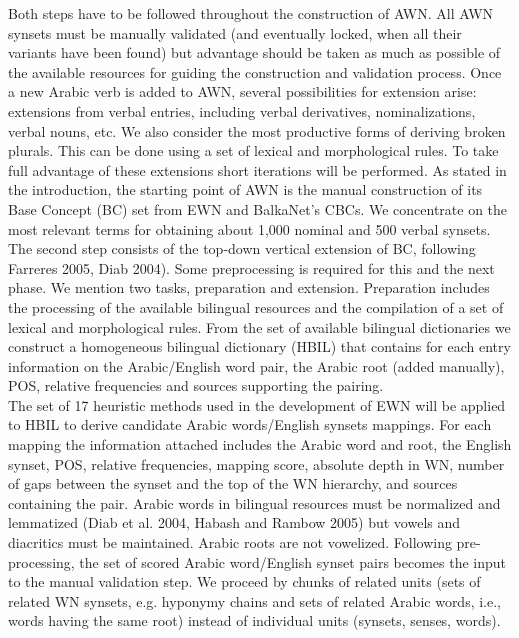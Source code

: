 Both steps have to be followed throughout the construction of AWN. All AWN synsets must be manually validated (and eventually locked, when all their variants have been found) but advantage should be taken as much as possible of the available resources for guiding the construction and validation process. Once a new Arabic verb is added to AWN, several possibilities for extension arise: extensions from verbal entries, including verbal derivatives, nominalizations, verbal nouns, etc. We also consider the most productive forms of deriving broken plurals. This can be done using a set of lexical and morphological rules. To take full advantage of these extensions short iterations will be performed. As stated in the introduction, the starting point of AWN is the manual construction of its Base Concept (BC) set from EWN and BalkaNet's CBCs. We concentrate on the most relevant terms for obtaining about 1,000 nominal and 500 verbal synsets. \\
The second step consists of the top-down vertical extension of BC, following Farreres 2005, Diab 2004). Some preprocessing is required for this and the next phase. We mention two tasks, preparation and extension. Preparation includes the processing of the available bilingual resources and the compilation of a set of lexical and morphological rules. From the set of available bilingual dictionaries we construct a homogeneous bilingual dictionary (HBIL) that contains for each entry information on the Arabic/English word pair, the Arabic root (added manually), POS, relative frequencies and sources supporting the pairing\citep{awn_2}.\\
The set of 17 heuristic methods used in the development of EWN will be applied to HBIL to derive candidate Arabic words/English synsets mappings. For each mapping the information attached includes the Arabic word and root, the English synset, POS, relative frequencies, mapping score, absolute depth in WN, number of gaps between the synset and the top of the WN hierarchy, and sources containing the pair.
Arabic words in bilingual resources must be normalized and lemmatized (Diab et al. 2004, Habash and Rambow 2005) but vowels and diacritics must be maintained. Arabic roots are not vowelized.
Following pre-processing, the set of scored Arabic word/English synset pairs becomes the input to the manual validation step. We proceed by chunks of related units (sets of related WN synsets, e.g. hyponymy chains and sets of related Arabic words, i.e., words having the same root) instead of individual units (synsets, senses, words).\\

